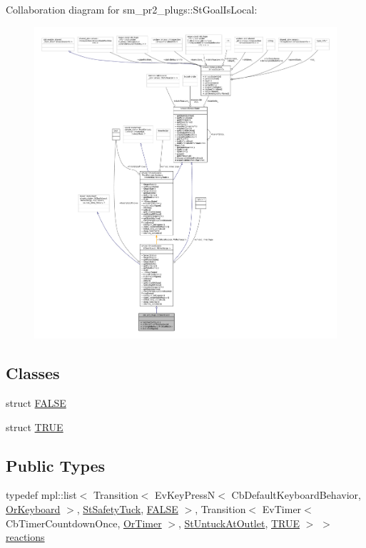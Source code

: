 Collaboration diagram for sm\+\_\+pr2\+\_\+plugs\+:\+:St\+Goal\+Is\+Local\+:
\nopagebreak
\begin{figure}[H]
\begin{center}
\leavevmode
\includegraphics[width=350pt]{structsm__pr2__plugs_1_1StGoalIsLocal__coll__graph}
\end{center}
\end{figure}
\subsection*{Classes}
\begin{DoxyCompactItemize}
\item 
struct \hyperlink{structsm__pr2__plugs_1_1StGoalIsLocal_1_1FALSE}{F\+A\+L\+SE}
\item 
struct \hyperlink{structsm__pr2__plugs_1_1StGoalIsLocal_1_1TRUE}{T\+R\+UE}
\end{DoxyCompactItemize}
\subsection*{Public Types}
\begin{DoxyCompactItemize}
\item 
typedef mpl\+::list$<$ Transition$<$ Ev\+Key\+PressN$<$ Cb\+Default\+Keyboard\+Behavior, \hyperlink{classsm__pr2__plugs_1_1OrKeyboard}{Or\+Keyboard} $>$, \hyperlink{structsm__pr2__plugs_1_1StSafetyTuck}{St\+Safety\+Tuck}, \hyperlink{structsm__pr2__plugs_1_1StGoalIsLocal_1_1FALSE}{F\+A\+L\+SE} $>$, Transition$<$ Ev\+Timer$<$ Cb\+Timer\+Countdown\+Once, \hyperlink{classsm__pr2__plugs_1_1OrTimer}{Or\+Timer} $>$, \hyperlink{structsm__pr2__plugs_1_1StUntuckAtOutlet}{St\+Untuck\+At\+Outlet}, \hyperlink{structsm__pr2__plugs_1_1StGoalIsLocal_1_1TRUE}{T\+R\+UE} $>$ $>$ \hyperlink{structsm__pr2__plugs_1_1StGoalIsLocal_a5e2307f3b40c73716bdb763e1d92dce2}{reactions}
\end{DoxyCompactItemize}
